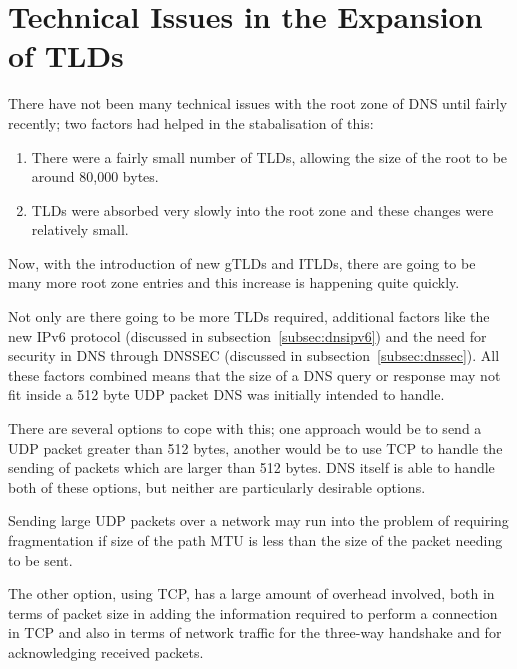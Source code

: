 \documentclass[11pt, a4paper]{article}
\begin{document}


\section{Technical Issues in the Expansion of TLDs}

There have not been many technical issues with the root zone of \gls{DNS} until
fairly recently; two factors had helped in the stabalisation of 
this\cite{manning2011challenges}:

\begin{enumerate}
\item There were a fairly small number of \glspl{TLD}, allowing the size of the
      root to be around 80,000 bytes.
\item \glspl{TLD} were absorbed very slowly into the root zone and these
      changes were relatively small.
\end{enumerate}

Now, with the introduction of new \glspl{gTLD} and \glspl{ITLD}, there are 
going to be many more root zone entries and this increase is happening quite
quickly.

Not only are there going to be more \glspl{TLD} required, additional factors
like the new IPv6 protocol (discussed in subsection~\ref{subsec:dnsipv6}) and 
the need for security in \gls{DNS} through \gls{DNSSEC}\cite{rfc2535} 
(discussed in subsection~\ref{subsec:dnssec}). All these factors combined means
that the size of a \gls{DNS} query or response may not fit inside a 512 byte 
\gls{UDP} packet \gls{DNS} was initially intended to handle.

There are several options to cope with this; one approach would be to send a
\gls{UDP} packet greater than 512 bytes, another would be to use \gls{TCP} to
handle the sending of packets which are larger than 512 bytes. \gls{DNS} itself
is able to handle both of these options, but neither are particularly desirable
options.

Sending large \gls{UDP} packets over a network may run into the problem of 
requiring fragmentation if size of the path \gls{MTU} is less than the size of
the packet needing to be sent.

The other option, using \gls{TCP}, has a large amount of overhead involved, 
both in terms of packet size in adding the information required to perform a
connection in \gls{TCP} and also in terms of network traffic for the three-way 
handshake and for acknowledging received packets.
\end{document}
